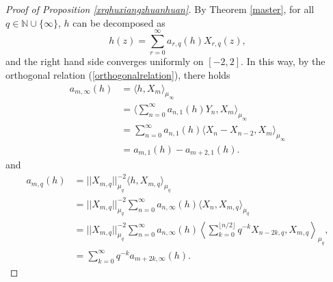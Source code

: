 \documentclass{article}
\begin{document}
\begin{proof}[Proof of Proposition \ref{xrqhuxiangzhuanhuan}]
    By Theorem \ref{master}, for all $q \in \mathbb{N}\cup \{\infty\}$, 
    $h$ can be decomposed as 
    $$h(z)=\sum_{r=0}^{\infty}a_{r,q}(h)X_{r,q}(z),$$
    and the right hand side converges uniformly on $[-2,2]$. In this way, by the orthogonal relation (\ref{orthogonalrelation}), there holds
    \begin{equation*}
    \begin{aligned}
        a_{m,\infty}(h)&=\langle h, X_m\rangle_{\mu_{\infty}}\\
        &=\langle \sum_{n=0}^{\infty}a_{n,1}(h)Y_n, X_m\rangle_{\mu_{\infty}}\\
        &=\sum_{n=0}^{\infty}a_{n,1}(h)\langle X_n-X_{n-2}, X_m\rangle_{\mu_{\infty}}\\
        &=a_{m,1}(h)-a_{m+2,1}(h).
    \end{aligned}
\end{equation*}
and
\begin{equation*}
\begin{aligned}
    a_{m,q}(h)&=||X_{m,q}||_{\mu_q}^{-2}\langle h, X_{m,q} \rangle _{\mu_q}\\
    &=||X_{m,q}||_{\mu_q}^{-2}\sum_{n=0}^{\infty}a_{n,\infty}(h)\langle X_n, X_{m,q} \rangle _{\mu_q}\\
    &=||X_{m,q}||_{\mu_q}^{-2}\sum_{n=0}^{\infty}a_{n,\infty}(h) \left\langle
    \sum_{k=0}^{\lfloor n/2\rfloor}q^{-k}X_{n-2k,q}, X_{m,q} \right\rangle _{\mu_q},\\
    &=\sum_{k=0}^{\infty} q^{-k} a_{m+2k,\infty}(h).
\end{aligned}
\end{equation*}
    
\end{proof}
\end{document}
